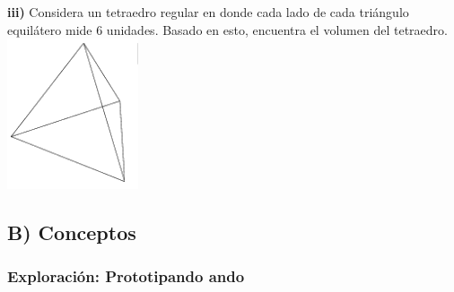 \documentclass[12pt,a4paper]{article}
\begin{document}
\begin{tcolorbox}[enhanced, breakable,
	colback=fondoverde, colframe=verdeclaro, title=\textbf{PRACTICA}]
	\vspace{3mm}
	
	\begin{tcolorbox}[enhanced, frame hidden, boxrule=0pt, colback=fondoverde,
		sidebyside, sidebyside align=top seam, righthand width=0.15\textwidth,
		sidebyside gap=8pt]
		\textbf{iii)} Considera un tetraedro regular en donde cada lado de cada triángulo equilátero mide 6 unidades.  
		Basado en esto, encuentra el volumen del tetraedro.
		\tcblower
		\includegraphics[width=\linewidth]{Figuras/fig4.png}
	\end{tcolorbox}
\end{tcolorbox}


\vspace{4mm}


\subsection*{B) Conceptos}

\subsubsection*{Exploración: Prototipando ando}
\end{document}
